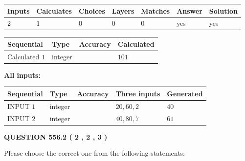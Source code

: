 \documentclass[12pt]{article}
\begin{document}
 
\noindent{}
 
 

 
   
   
   
   
\noindent\begin{tabular}{|l|l|l|l|l|l|l|}
 \hline
Inputs & Calculates & Choices & Layers & Matches & Answer & Solution \\ \hline
 2  & 
 1  & 
 0
  & 
 0  & 
 0  & 
  yes & 
  yes 
  \\ \hline
 \end{tabular}
   
   
   
   
\noindent{}
   
   
  
  
\noindent\begin{tabular}{|l|l|l|l|}
\hline
 Sequential & Type & Accuracy & Calculated \\ 
\hline
 
 
  Calculated $  1 $ & integer &  & 
  $ 101 $ 
 \\  \hline  
 \end{tabular}
   
   
   
   
\noindent\vspace{0.1in}\hspace{-0.08in} {\textbf{\Large{All inputs: }}}
   
   
  
  
\noindent\begin{tabular}{|l|l|l|l|l|}
\hline
 Sequential & Type & Accuracy & Three inputs & Generated \\ 
\hline
 
 
  INPUT $  1 $ & integer &  & $
 20
 , 
 60
 , 
 2
 $ & $ 40 $ 
 \\  \hline  
 
 
  INPUT $  2 $ & integer &  & $
 40
 , 
 80
 , 
 7
 $ & $ 61 $ 
 \\  \hline  
 \end{tabular}
   
   
  
\vspace{0.2in}
  
{\textbf{\Large{QUESTION
556.2 
 ( 2 , 2 , 3 )
}}}
  
  
Please choose the correct one from the following statements:
 
\end{document}
